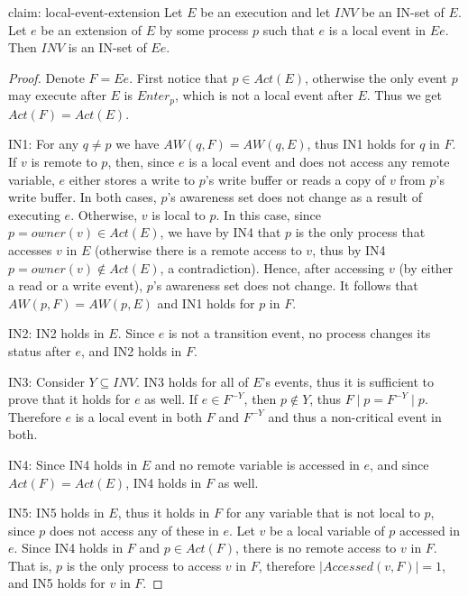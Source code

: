 \begin{claim-repeat} {claim: local-event-extension}
	Let $E$ be an execution and let $\mathit{INV}$ be an IN-set of $E$. Let $e$ be an extension of $E$ by some process $p$ such that $e$ is a local event in $E e$. Then $\mathit{INV}$ is an IN-set of $E e$.
\end{claim-repeat}

\begin{proof}
	Denote $F = E e$. First notice that $p \in Act(E)$, otherwise the only event $p$ may execute after $E$ is $Enter_p$, which is not a local event after $E$. Thus we get $Act(F) = Act(E)$.
	
	IN1: For any $q \neq p$ we have $AW(q,F) = AW(q,E)$, thus IN1 holds for $q$ in $F$. If $v$ is remote to $p$, then, since $e$ is a local event and does not access any remote variable, $e$ either stores a write to $p$'s write buffer or reads a copy of $v$ from $p$'s write buffer. In both cases, $p$'s awareness set does not change as a result of executing $e$. Otherwise, $v$ is local to $p$. In this case, since $p = owner(v) \in Act(E)$, we have by IN4 that $p$ is the only process that accesses $v$ in $E$ (otherwise there is a remote access to $v$, thus by IN4 $p = owner(v) \notin Act(E)$, a contradiction). Hence, after accessing $v$ (by either a read or a write event), $p$'s awareness set does not change. It follows that $AW(p,F) = AW(p,E)$ and IN1 holds for $p$ in $F$.
	
	IN2: IN2 holds in $E$. Since $e$ is not a transition event, no process changes its status after $e$, and IN2 holds in $F$.
	
	IN3: Consider $Y \subseteq INV$. IN3 holds for all of $E$'s events, thus it is sufficient to prove that it holds for $e$ as well. If $e \in F^{-Y}$, then $p \notin Y$, thus $F \mid p = F^{-Y} \mid p$. Therefore $e$ is a local event in both $F$ and $F^{-Y}$ and thus a non-critical event in both.
	
	IN4: Since IN4 holds in $E$ and no remote variable is accessed in $e$, and since $Act(F) = Act(E)$, IN4 holds in $F$ as well.
	
	IN5: IN5 holds in $E$, thus it holds in $F$ for any variable that is not local to $p$, since $p$ does not access any of these in $e$. Let $v$ be a local variable of $p$ accessed in $e$. Since IN4 holds in $F$ and $p \in Act(F)$, there is no remote access to $v$ in $F$. That is, $p$ is the only process to access $v$ in $F$, therefore $|Accessed(v,F)| = 1$, and IN5 holds for $v$ in $F$.	
\end{proof}



